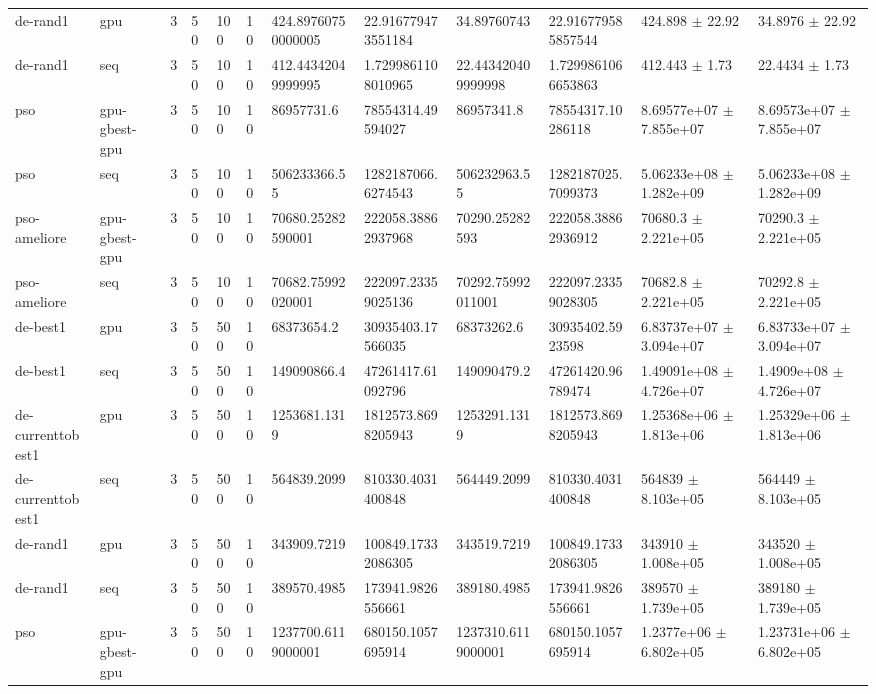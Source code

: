 \begin{table}[t]
\begin{tabular}{llllllllllll}
de-rand1 & gpu & 3 & 50 & 100 & 10 & 424.89760750000005 & 22.916779473551184 & 34.89760743 & 22.916779585857544 & 424.898 $\pm$ 22.92 & 34.8976 $\pm$ 22.92 \\
de-rand1 & seq & 3 & 50 & 100 & 10 & 412.44342049999995 & 1.7299861108010965 & 22.443420409999998 & 1.7299861066653863 & 412.443 $\pm$ 1.73 & 22.4434 $\pm$ 1.73 \\
pso & gpu-gbest-gpu & 3 & 50 & 100 & 10 & 86957731.6 & 78554314.49594027 & 86957341.8 & 78554317.10286118 & 8.69577e+07 $\pm$ 7.855e+07 & 8.69573e+07 $\pm$ 7.855e+07 \\
pso & seq & 3 & 50 & 100 & 10 & 506233366.55 & 1282187066.6274543 & 506232963.55 & 1282187025.7099373 & 5.06233e+08 $\pm$ 1.282e+09 & 5.06233e+08 $\pm$ 1.282e+09 \\
pso-ameliore & gpu-gbest-gpu & 3 & 50 & 100 & 10 & 70680.25282590001 & 222058.38862937968 & 70290.25282593 & 222058.38862936912 & 70680.3 $\pm$ 2.221e+05 & 70290.3 $\pm$ 2.221e+05 \\
pso-ameliore & seq & 3 & 50 & 100 & 10 & 70682.75992020001 & 222097.23359025136 & 70292.75992011001 & 222097.23359028305 & 70682.8 $\pm$ 2.221e+05 & 70292.8 $\pm$ 2.221e+05 \\
de-best1 & gpu & 3 & 50 & 500 & 10 & 68373654.2 & 30935403.17566035 & 68373262.6 & 30935402.5923598 & 6.83737e+07 $\pm$ 3.094e+07 & 6.83733e+07 $\pm$ 3.094e+07 \\
de-best1 & seq & 3 & 50 & 500 & 10 & 149090866.4 & 47261417.61092796 & 149090479.2 & 47261420.96789474 & 1.49091e+08 $\pm$ 4.726e+07 & 1.4909e+08 $\pm$ 4.726e+07 \\
de-currenttobest1 & gpu & 3 & 50 & 500 & 10 & 1253681.1319 & 1812573.8698205943 & 1253291.1319 & 1812573.8698205943 & 1.25368e+06 $\pm$ 1.813e+06 & 1.25329e+06 $\pm$ 1.813e+06 \\
de-currenttobest1 & seq & 3 & 50 & 500 & 10 & 564839.2099 & 810330.4031400848 & 564449.2099 & 810330.4031400848 & 564839 $\pm$ 8.103e+05 & 564449 $\pm$ 8.103e+05 \\
de-rand1 & gpu & 3 & 50 & 500 & 10 & 343909.7219 & 100849.17332086305 & 343519.7219 & 100849.17332086305 & 343910 $\pm$ 1.008e+05 & 343520 $\pm$ 1.008e+05 \\
de-rand1 & seq & 3 & 50 & 500 & 10 & 389570.4985 & 173941.9826556661 & 389180.4985 & 173941.9826556661 & 389570 $\pm$ 1.739e+05 & 389180 $\pm$ 1.739e+05 \\
pso & gpu-gbest-gpu & 3 & 50 & 500 & 10 & 1237700.6119000001 & 680150.1057695914 & 1237310.6119000001 & 680150.1057695914 & 1.2377e+06 $\pm$ 6.802e+05 & 1.23731e+06 $\pm$ 6.802e+05 \\

\end{tabular}
\end{table}
